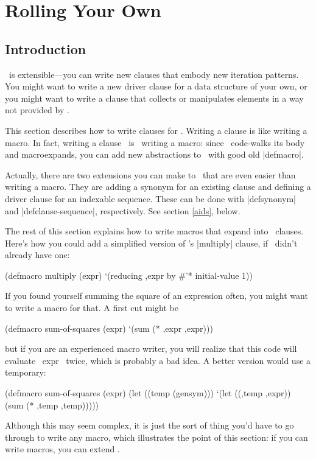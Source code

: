 \section{Rolling Your Own}
\label{extend}

\subsection{Introduction}

\iter\ is extensible---you can write new clauses that embody new
iteration patterns.  You might want to write a new driver clause for a
data structure of your own, or you might want to write a clause that
collects or manipulates elements in a way not provided by \iter. 

This section describes how to write clauses for \iter.  Writing a
clause is like writing a macro.  In fact, writing a clause ~is~
writing a macro: since \iter\ code-walks its body and macroexpands,
you can add new abstractions to \iter\ with good old |defmacro|.

Actually, there are two extensions you can make to \iter\ that are
even easier than writing a macro.  They are adding a synonym for an
existing clause and defining a driver clause for an indexable
sequence.  These can be done with |defsynonym| and
|defclause-sequence|, respectively.  See section \ref{aids}, below.

The rest of this section explains how to write macros that expand into
\iter\ clauses.
Here's how you could add a simplified version of \iter's |multiply|
clause, if \iter\ didn't already have one:
\begin{program}
(defmacro multiply (expr)
  `(reducing ,expr by \#'* initial-value 1))
\end{program}

If you found yourself summing the square of an expression often, you
might want to write a macro for that.  A first cut might be
\begin{program}
(defmacro sum-of-squares (expr)
  `(sum (* ,expr ,expr)))
\end{program}
but if you are an experienced macro writer, you will realize that this
code will evaluate ~expr~ twice, which is probably a bad idea.  A
better version would use a temporary:
\begin{program}
(defmacro sum-of-squares (expr)
  (let ((temp (gensym)))
    `(let ((,temp ,expr))
       (sum (* ,temp ,temp)))))
\end{program}
Although this may seem complex, it is just the sort of thing you'd
have to go through to write any macro, which illustrates the point of
this section: if you can write macros, you can extend \iter.

